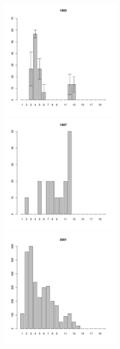 \begin{figure}[h]
\begin{multicols}{3}
\hfill
\includegraphics[width=60mm]{../White_Sea/Luvenga_Goreliy/high_1993_.pdf}
\hfill
\includegraphics[width=60mm]{../White_Sea/Luvenga_Goreliy/high_1997_.pdf}
\hfill
\includegraphics[width=60mm]{../White_Sea/Luvenga_Goreliy/high_2001_.pdf}
\end{multicols}



\end{figure}
